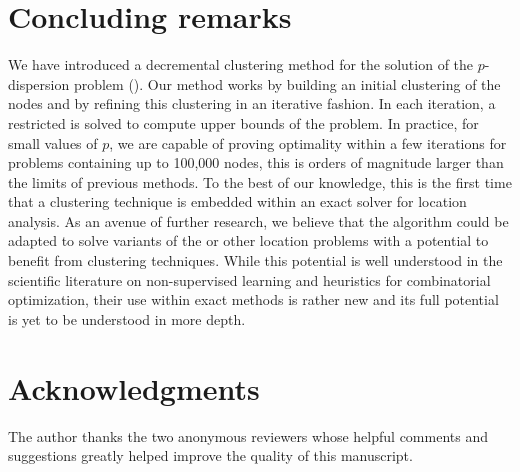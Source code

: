 \documentclass[ijoo,nonblindrev]{informs-ijoo}
\begin{document}
\section{Concluding remarks\label{section:conclusions}}

We have introduced a decremental clustering method for the solution of the $p$-dispersion problem (\pDP{}). Our method works by building an initial clustering of the nodes and by refining this clustering in an iterative fashion. In each iteration, a restricted \pDP{} is solved to compute upper bounds of the problem. In practice, for small values of $p$, we are capable of proving optimality within a few iterations for problems containing up to 100,000 nodes, this is orders of magnitude larger than the limits of previous methods. To the best of our knowledge, this is the first time that a clustering technique is embedded within an exact solver for location analysis. As an avenue of further research, we believe that the algorithm could be adapted to solve variants of the \pDP{} or other location problems with a potential to benefit from clustering techniques. While this potential is well understood in the scientific literature on non-supervised learning and heuristics for combinatorial optimization, their use within exact methods is rather new and its full potential is yet to be understood in more depth.

\section*{Acknowledgments}

The author thanks the two anonymous reviewers whose helpful comments and suggestions greatly helped improve the quality of this manuscript.%



\end{document}
